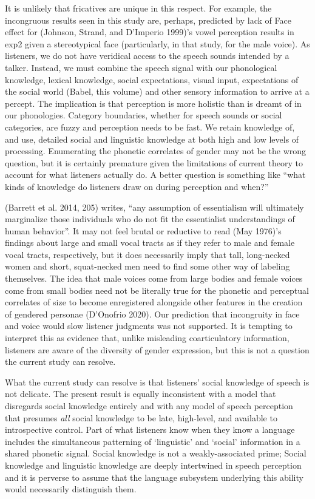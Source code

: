 \documentclass[
  letterpaper,
  DIV=11,
  numbers=noendperiod]{scrartcl}
\begin{document}
It is unlikely that fricatives are unique in this respect. For example,
the incongruous results seen in this study are, perhaps, predicted by
lack of Face effect for (Johnson, Strand, and D'Imperio 1999)'s vowel
perception results in exp2 given a stereotypical face (particularly, in
that study, for the male voice). As listeners, we do not have veridical
access to the speech sounds intended by a talker. Instead, we must
combine the speech signal with our phonological knowledge, lexical
knowledge, social expectations, visual input, expectations of the social
world (Babel, this volume) and other sensory information to arrive at a
percept. The implication is that perception is more holistic than is
dreamt of in our phonologies. Category boundaries, whether for speech
sounds or social categories, are fuzzy and perception needs to be fast.
We retain knowledge of, and use, detailed social and linguistic
knowledge at both high and low levels of processing. Enumerating the
phonetic correlates of gender may not be the wrong question, but it is
certainly premature given the limitations of current theory to account
for what listeners actually do. A better question is something like
``what kinds of knowledge do listeners draw on during perception and
when?''

(Barrett et al. 2014, 205) writes, ``any assumption of essentialism will
ultimately marginalize those individuals who do not fit the essentialist
understandings of human behavior''. It may not feel brutal or reductive
to read (May 1976)'s findings about large and small vocal tracts as if
they refer to male and female vocal tracts, respectively, but it does
necessarily imply that tall, long-necked women and short, squat-necked
men need to find some other way of labeling themselves. The idea that
male voices come from large bodies and female voices come from small
bodies need not be literally true for the phonetic and perceptual
correlates of size to become enregistered alongside other features in
the creation of gendered personae (D'Onofrio 2020). Our prediction that
incongruity in face and voice would slow listener judgments was not
supported. It is tempting to interpret this as evidence that, unlike
misleading coarticulatory information, listeners are aware of the
diversity of gender expression, but this is not a question the current
study can resolve.

What the current study can resolve is that listeners' social knowledge
of speech is not delicate. The present result is equally inconsistent
with a model that disregards social knowledge entirely and with any
model of speech perception that presumes \emph{all} social knowledge to
be late, high-level, and available to introspective control. Part of
what listeners know when they know a language includes the simultaneous
patterning of `linguistic' and `social' information in a shared phonetic
signal. Social knowledge is not a weakly-associated prime; Social
knowledge and linguistic knowledge are deeply intertwined in speech
perception and it is perverse to assume that the language subsystem
underlying this ability would necessarily distinguish them.
\end{document}
